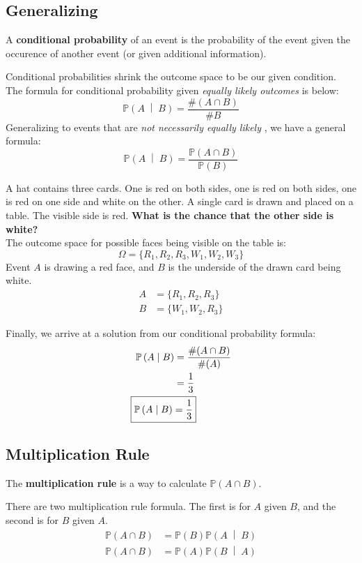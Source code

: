 \documentclass[titlepage, 12pt, leqno]{article}
\begin{document}
\subsection{Generalizing}
\begin{definition}
    A \textbf{conditional probability} of an event is the probability of the event given the occurence of another event (or given additional information).
\end{definition}
Conditional probabilities shrink the outcome space to be our given condition. \\
The formula for conditional probability given \textit{equally likely outcomes} is below:
\[
    \mathbb{P}\left(A \;\middle|\; B\right) = \frac{\#(A \cap B)}{\#B}
\]
Generalizing to events that are \textit{not necessarily equally likely} , we have a general formula:
\[
    \mathbb{P}\left(A \;\middle|\; B\right) = \frac{\mathbb{P}(A \cap B)}{\mathbb{P}(B)} 
\]
\begin{ex}
    A hat contains three cards. One is red on both sides, one is red on both sides, one is red on one side and white on the other. A single card is drawn and placed on a table. The visible side is red. \textbf{What is the chance that the other side is white?} \\
    The outcome space for possible faces being visible on the table is:
    \[
        \Omega = \{R_1, R_2, R_3, W_1, W_2, W_3\}
    \]
    Event $A$ is drawing a red face, and $B$ is the underside of the drawn card being white.
   \begin{align*}
       A &= \{R_1, R_2, R_3\} \\
       B &= \{W_1, W_2, R_3\}
   \end{align*}
    
   Finally, we arrive at a solution from our conditional probability formula:
  \begin{align*}
      \mathbb{P}\left(A \;\middle|\; B\right) &= \frac{\#(A \cap B)}{\#(A)} \\
                                              &= \frac{1}{3} \\
      \Aboxed{\mathbb{P}\left(A \;\middle|\; B\right) &= \frac{1}{3}}
  \end{align*}
\end{ex}

\subsection{Multiplication Rule}
\begin{definition}
    The \textbf{multiplication rule} is a way to calculate $\mathbb{P}(A \cap B)$.
\end{definition}
There are two multiplication rule formula. The first is for $A$ given $B$, and the second is for $B$ given $A$.
\begin{align*}
    \mathbb{P}(A \cap B) &= \mathbb{P}(B) \mathbb{P}\left(A \;\middle|\; B\right) \\
    \mathbb{P}(A \cap B) &= \mathbb{P}(A) \mathbb{P}\left(B \;\middle|\; A\right) 
\end{align*}
\end{document}
